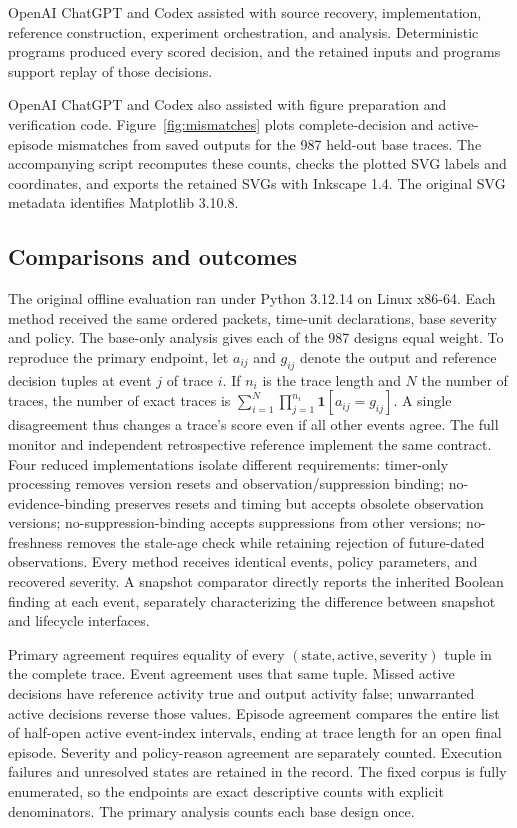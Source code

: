 \documentclass[preprint,11pt]{elsarticle}
\begin{document}
OpenAI ChatGPT and Codex assisted with source recovery, implementation, reference construction, experiment orchestration, and analysis. Deterministic programs produced every scored decision, and the retained inputs and programs support replay of those decisions.

OpenAI ChatGPT and Codex also assisted with figure preparation and verification code. Figure~\ref{fig:mismatches} plots complete-decision and active-episode mismatches from saved outputs for the 987 held-out base traces. The accompanying script recomputes these counts, checks the plotted SVG labels and coordinates, and exports the retained SVGs with Inkscape 1.4. The original SVG metadata identifies Matplotlib 3.10.8.

\subsection{Comparisons and outcomes}
The original offline evaluation ran under Python 3.12.14 on Linux x86-64. Each method received the same ordered packets, time-unit declarations, base severity and policy. The base-only analysis gives each of the 987 designs equal weight. To reproduce the primary endpoint, let $a_{ij}$ and $g_{ij}$ denote the output and reference decision tuples at event $j$ of trace $i$. If $n_i$ is the trace length and $N$ the number of traces, the number of exact traces is $\sum_{i=1}^{N}\prod_{j=1}^{n_i}\mathbf{1}[a_{ij}=g_{ij}]$. A single disagreement thus changes a trace's score even if all other events agree.
The full monitor and independent retrospective reference implement the same contract. Four reduced implementations isolate different requirements: timer-only processing removes version resets and observation/suppression binding; no-evidence-binding preserves resets and timing but accepts obsolete observation versions; no-suppression-binding accepts suppressions from other versions; no-freshness removes the stale-age check while retaining rejection of future-dated observations. Every method receives identical events, policy parameters, and recovered severity. A snapshot comparator directly reports the inherited Boolean finding at each event, separately characterizing the difference between snapshot and lifecycle interfaces.

Primary agreement requires equality of every $(\text{state},\text{active},\text{severity})$ tuple in the complete trace. Event agreement uses that same tuple. Missed active decisions have reference activity true and output activity false; unwarranted active decisions reverse those values. Episode agreement compares the entire list of half-open active event-index intervals, ending at trace length for an open final episode. Severity and policy-reason agreement are separately counted. Execution failures and unresolved states are retained in the record. The fixed corpus is fully enumerated, so the endpoints are exact descriptive counts with explicit denominators. The primary analysis counts each base design once.
\end{document}

